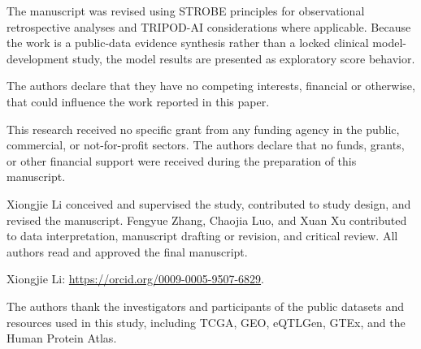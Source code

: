 \documentclass[pdflatex,sn-mathphys-num,referee,lineno]{sn-jnl}
\theoremstyle{thmstyleone}%
\theoremstyle{thmstyletwo}%
\theoremstyle{thmstylethree}%
\begin{document}
The manuscript was revised using STROBE principles for observational retrospective analyses and TRIPOD-AI considerations where applicable. Because the work is a public-data evidence synthesis rather than a locked clinical model-development study, the model results are presented as exploratory score behavior.

The authors declare that they have no competing interests, financial or otherwise, that could influence the work reported in this paper.

This research received no specific grant from any funding agency in the public, commercial, or not-for-profit sectors. The authors declare that no funds, grants, or other financial support were received during the preparation of this manuscript.

Xiongjie Li conceived and supervised the study, contributed to study design, and revised the manuscript. Fengyue Zhang, Chaojia Luo, and Xuan Xu contributed to data interpretation, manuscript drafting or revision, and critical review. All authors read and approved the final manuscript.

Xiongjie Li: \url{https://orcid.org/0009-0005-9507-6829}.

The authors thank the investigators and participants of the public datasets and resources used in this study, including TCGA, GEO, eQTLGen, GTEx, and the Human Protein Atlas.

\end{document}
